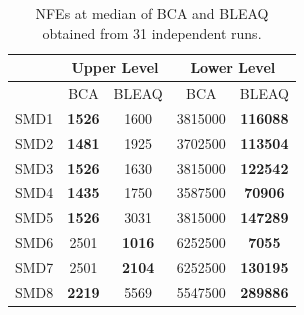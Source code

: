 \documentclass[conference]{IEEEtran}
\begin{document}
\begin{table}[!ht]
\renewcommand{\arraystretch}{1.3}
    \caption{NFEs at median of BCA and BLEAQ obtained from 31 independent runs.}
    \label{tab:ul-comparative-fes}
    \centering
    \begin{tabular}{|c|c|c||c|c|}
\hline
& \multicolumn{2}{c||}{Upper Level} & \multicolumn{2}{c|}{Lower Level} \\ \hline
& BCA & BLEAQ & BCA & BLEAQ \\ \hline
SMD1 & \textbf{1526} & 1600 & 3815000 & \textbf{116088} \\ \hline
SMD2 & \textbf{1481} & 1925 & 3702500 & \textbf{113504} \\ \hline
SMD3 & \textbf{1526} & 1630 & 3815000 & \textbf{122542} \\ \hline
SMD4 & \textbf{1435} & 1750 & 3587500 & \textbf{70906} \\ \hline
SMD5 & \textbf{1526} & 3031 & 3815000 & \textbf{147289} \\ \hline
SMD6 &     2501      & \textbf{1016} & 6252500 & \textbf{7055} \\ \hline
SMD7 &     2501      & \textbf{2104} & 6252500 & \textbf{130195} \\ \hline
SMD8 & \textbf{2219} & 5569 & 5547500 & \textbf{289886} \\ \hline
    \end{tabular}
\end{table}
\end{document}
